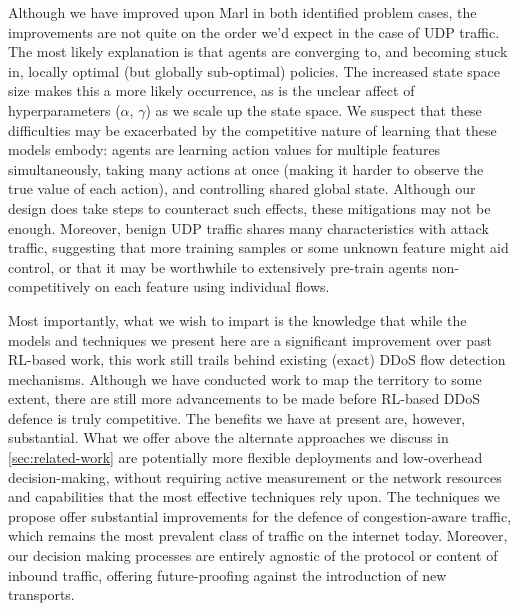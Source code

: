 \documentclass[10pt, times, conference, letterpaper]{IEEEtran}
\begin{document}
Although we have improved upon Marl in both identified problem cases, the improvements are not quite on the order we'd expect in the case of UDP traffic.
The most likely explanation is that agents are converging to, and becoming stuck in, locally optimal (but globally sub-optimal) policies.
The increased state space size makes this a more likely occurrence, as is the unclear affect of hyperparameters ($\alpha$, $\gamma$) as we scale up the state space.
We suspect that these difficulties may be exacerbated by the competitive nature of learning that these models embody: agents are learning action values for multiple features simultaneously, taking many actions at once (making it harder to observe the true value of each action), and controlling shared global state.
Although our design does take steps to counteract such effects, these mitigations may not be enough.
Moreover, benign UDP traffic shares many characteristics with attack traffic, suggesting that more training samples or some unknown feature might aid control, or that it may be worthwhile to extensively pre-train agents non-competitively on each feature using individual flows.


Most importantly, what we wish to impart is the knowledge that while the models and techniques we present here are a significant improvement over past RL-based work, this work still trails behind existing (exact) DDoS flow detection mechanisms.
Although we have conducted work to map the territory to some extent, there are still more advancements to be made before RL-based DDoS defence is truly competitive.
The benefits we have at present are, however, substantial.
What we offer above the alternate approaches we discuss in \cref{sec:related-work} are potentially more flexible deployments and low-overhead decision-making, without requiring active measurement or the network resources and capabilities that the most effective techniques rely upon.
The techniques we propose offer substantial improvements for the defence of congestion-aware traffic, which remains the most prevalent class of traffic on the internet today.
Moreover, our decision making processes are entirely agnostic of the protocol or content of inbound traffic, offering future-proofing against the introduction of new transports.
\end{document}
